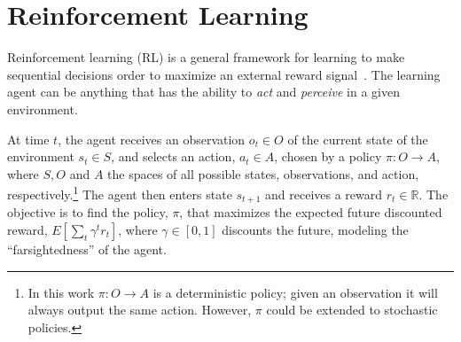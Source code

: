 


\section{Reinforcement Learning}
\label{sec:rl}

Reinforcement learning (RL) is a general framework for learning to
make sequential decisions order to maximize an external reward
signal~\cite{Kaelbling1996, Sutton1998}.  The learning agent can be anything
that has the ability to \emph{act} and \emph{perceive} in a given
environment.

At time $t$, the agent receives an observation $o_t \in O$ of the
current state of the environment $s_t \in S$, and selects an action,
$a_t \in A$, chosen by a policy $\pi: O \to A$, where $S, O$ and $A$
the spaces of all possible states, observations, and action,
respectively.\footnote{In this work $\pi: O \to A$ is a deterministic
  policy; given an observation it will always output the same
  action. However, $\pi$ could be extended to stochastic policies.}
The agent then enters state $s_{t+1}$ and receives a reward $r_t \in
\mathds{R}$.  The objective is to find the policy, $\pi$, that
maximizes the expected future discounted reward,
$E[\sum_t\gamma^tr_t]$, where $\gamma\in[0,1]$ discounts the future,
modeling the ``farsightedness'' of the agent.

